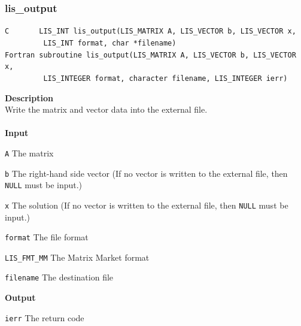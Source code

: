 \documentclass[a4paper]{article}
\newcommand{\namelistlabel}[1]{\mbox{#1}\hfill}
\newenvironment{namelist}[1]{%
\begin{list}{}
  {\let\makelabel\namelistlabel
  \settowidth{\labelwidth}{#1}
  \setlength{\leftmargin}{1.1\labelwidth}}
  }{%
\end{list}}
\begin{document}
\subsubsection{lis\_output}
\begin{screen}
\verb|C       LIS_INT lis_output(LIS_MATRIX A, LIS_VECTOR b, LIS_VECTOR x,|\\
\verb|         LIS_INT format, char *filename)|\\
\verb|Fortran subroutine lis_output(LIS_MATRIX A, LIS_VECTOR b, LIS_VECTOR x,|\\
\verb|         LIS_INTEGER format, character filename, LIS_INTEGER ierr)|
\end{screen}
{\bf Description}\\
\indent
Write the matrix and vector data into the external file.
\\ \\
\noindent
{\bf Input}
\begin{namelist}{XXXXXXXXXXXXXXXXXXXX}
\item[\tt A] The matrix
\item[\tt b] The right-hand side vector (If no vector is written to the external file, then {\tt NULL} must be input.)
\item[\tt x] The solution (If no vector is written to the external file, then {\tt NULL} must be input.)
\item[\tt format] The file format
\begin{namelist}{XXXXXXXXXXXXXXXXXXXX}
\item[\tt LIS\_FMT\_MM] The Matrix Market format
\end{namelist}
\item[\tt filename] The destination file
\end{namelist}
{\bf Output}
\begin{namelist}{XXXXXXXXXXXXXXXXXXXX}
\item[\tt ierr] The return code
\end{namelist}
\end{document}
